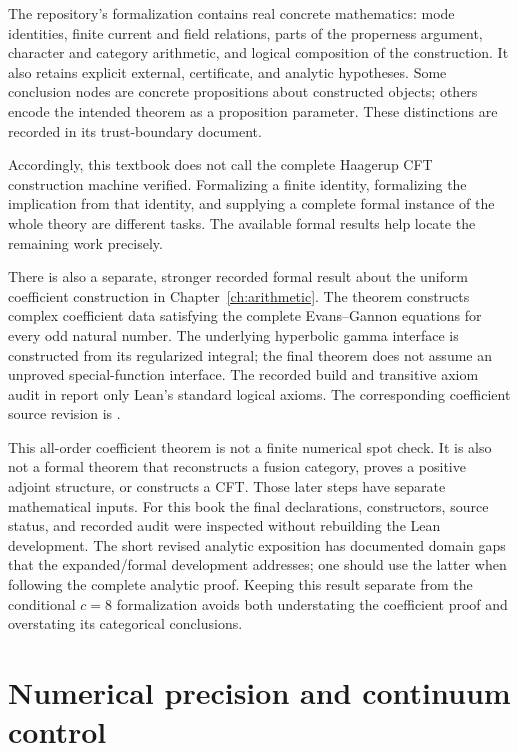 The repository's formalization contains real concrete mathematics:
mode identities, finite current and field relations, parts of the
properness argument, character and category arithmetic, and
logical composition of the construction. It also retains explicit
external, certificate, and analytic hypotheses. Some conclusion
nodes are concrete propositions about constructed objects;
others encode the intended theorem as a proposition parameter.
These distinctions are recorded in its trust-boundary document.

Accordingly, this textbook does not call the complete Haagerup
CFT construction machine verified. Formalizing a finite identity,
formalizing the implication from that identity, and supplying a
complete formal instance of the whole theory are different tasks.
The available formal results help locate the remaining work
precisely.

There is also a separate, stronger recorded formal result about
the uniform coefficient construction in
Chapter~\ref{ch:arithmetic}. The theorem
constructs complex coefficient data satisfying the complete
Evans--Gannon equations for every odd natural number. The
underlying hyperbolic gamma interface is constructed from its
regularized integral; the final theorem does not assume an
unproved special-function interface. The recorded build and
transitive axiom audit in  report
only Lean's standard logical axioms. The corresponding coefficient
source revision is
.

This all-order coefficient theorem is not a finite numerical
spot check. It is also not a formal theorem that reconstructs a
fusion category, proves a positive adjoint structure, or constructs
a CFT. Those later steps have separate mathematical inputs.
For this book the final declarations, constructors, source
status, and recorded audit were inspected without rebuilding
the Lean development. The short revised analytic exposition
has documented domain gaps that the expanded/formal development
addresses; one should use the latter when following the complete
analytic proof. Keeping this result separate from the conditional
$c=8$ formalization avoids both understating the coefficient proof
and overstating its categorical conclusions.

\section{Numerical precision and continuum control}

